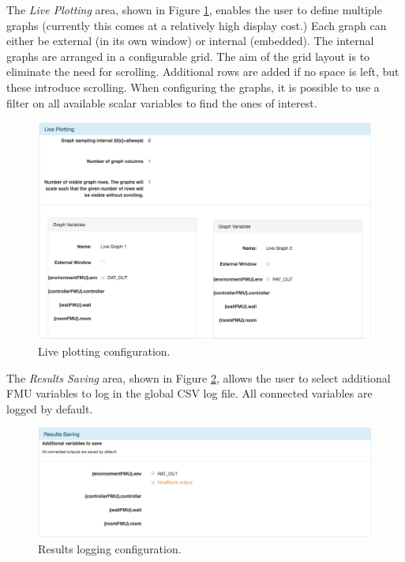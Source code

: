 The \textit{Live Plotting} area, shown in Figure \ref{fig:liveplotting-conf}, enables the user to define multiple graphs (currently this comes at a relatively high display cost.)  Each graph can either be external (in its own window) or internal (embedded). The internal graphs are arranged in a configurable grid.  The aim of the grid layout is to eliminate the need for scrolling.  Additional rows are added if no space is left, but these introduce scrolling. When configuring the graphs, it is possible to use a filter on all available scalar variables to find the ones of interest.
%
%
%
\begin{figure}[ht]
\centering
\includegraphics[width=\textwidth]{./figures/app/livePlotting}
\caption{Live plotting configuration.}
\label{fig:liveplotting-conf}
\end{figure}
%
%
%

The \emph{Results Saving} area, shown in Figure \ref{fig:saving-conf}, allows the user to select additional FMU variables to log in the global CSV log file.  All connected variables are logged by default.
%
%
%
\begin{figure}[ht]
\centering
\includegraphics[width=\textwidth]{./figures/app/resultsSaving}
\caption{Results logging configuration.}
\label{fig:saving-conf}
\end{figure}
%
%
%

